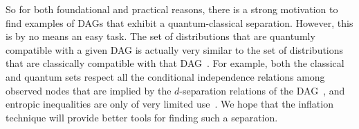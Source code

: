 {So for both foundational and practical reasons, there is a strong motivation to find examples of DAGs that exhibit a quantum-classical separation.
However, this is by no means an easy task.
The set of distributions that are quantumly compatible with a given DAG is actually very similar to the set of distributions that are classically compatible with that DAG~\cite{pusey2014gdag,fritz2012bell}. For example, both the classical and quantum sets respect all the conditional independence relations among observed nodes that are implied by the $d$-separation relations of the DAG~\cite{pusey2014gdag}, and entropic inequalities are only of very limited use~\cite{chaves2012entropic,fritz2012bell}. We hope that the inflation technique will provide better tools for finding such a separation.


}
